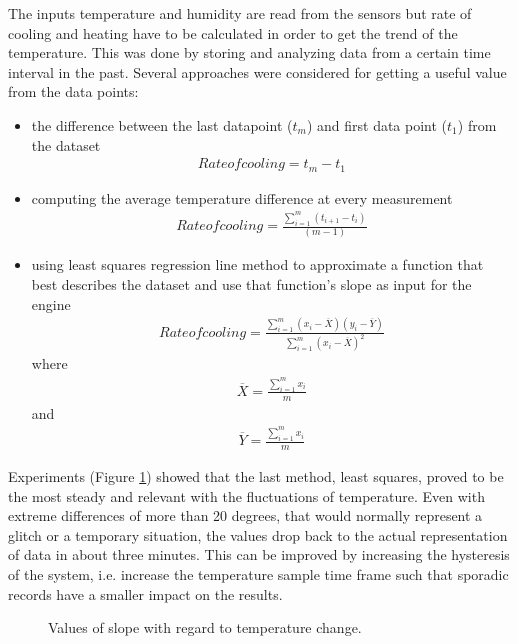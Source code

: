 \documentclass[conference]{IEEEtran}
\begin{document}
The inputs temperature and humidity are read from the sensors but rate of cooling and heating have to be
calculated in order to get the trend of the temperature. This was done by storing and analyzing data from
a certain time interval in the past. Several approaches were considered for getting a useful value from the
data points:
\begin{itemize}

\item the difference between the last datapoint ($t_{m}$) and first data point ($t_{1}$) from the dataset
\begin{align}
Rate of cooling = t_{m} - t_{1}
\end{align}

\item computing the average temperature difference at every measurement
\begin{align}
Rate of cooling = \frac{\sum_{i=1}^{m}(t_{i + 1} - t_{i})}{(m - 1)}
\end{align}

\item using least squares regression line method to approximate a function that best describes the dataset
and use that function's slope as input for the engine
\begin{align}
Rate of cooling = \frac{\sum_{i=1}^{m}(x_{i} - \overline{X})(y_{i} - \overline{Y})}{\sum_{i=1}^{m}(x_{i} - \overline{X})^2}
\end{align}
where
\begin{align}
\overline{X} = \frac{\sum_{i=1}^{m} x_{i}}{m}
\end{align}
and
\begin{align}
\overline{Y} = \frac{\sum_{i=1}^{m} x_{i}}{m}
\end{align}

\end{itemize}

Experiments (Figure \ref{fig:experiments}) showed that the last method, least squares, proved to be the most
steady and relevant with the fluctuations of temperature.
Even with extreme differences of more than 20 degrees, that would normally represent a glitch or a temporary
situation, the values drop back to the actual representation of data in about three minutes. This can be
improved by increasing the hysteresis of the system, i.e. increase the temperature sample time frame such
that sporadic records have a smaller impact on the results.

\begin{figure}[h!]
\label{fig:nn}
\centerline{}
      \caption[MainModule]{Values of slope with regard to temperature change.}
\label{fig:experiments}
\end{figure}
\end{document}
